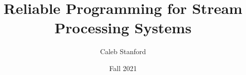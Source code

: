 \documentclass{article}
\title{\Large{} Reliable Programming for Stream Processing Systems}
\author{Caleb Stanford}
\date{Fall 2021}
\begin{document}
\maketitle{}



\tableofcontents{}











\renewcommand{\refname}{Other References}


\end{document}
